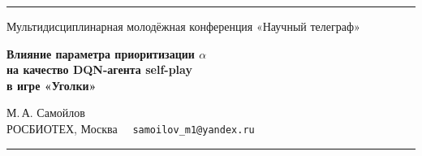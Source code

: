 \documentclass[12pt,aspectratio=169]{beamer}
\begin{document}


\begin{frame}[plain]

  {\color{pblue!40}\rule{\paperwidth}{2pt}}\vspace{-2pt}

  \vspace{1.8cm}
  \begin{center}
    {\color{pgray}\small
      Мультидисциплинарная молодёжная конференция «Научный телеграф»}

    \vspace{0.6cm}
    {\color{pdark}\LARGE\bfseries
      Влияние параметра приоритизации $\alpha$\\[6pt]
      на качество DQN-агента self-play\\[6pt]
      в игре «Уголки»}

    \vspace{0.7cm}
    {\large М.\,А. Самойлов}\\[3pt]
    {\color{pgray}\small РОСБИОТЕХ, Москва \ \ \texttt{samoilov\_m1@yandex.ru}}
  \end{center}

  \vfill
  {\color{pblue!30}\rule{\paperwidth}{1pt}}

\end{frame}
\end{document}
